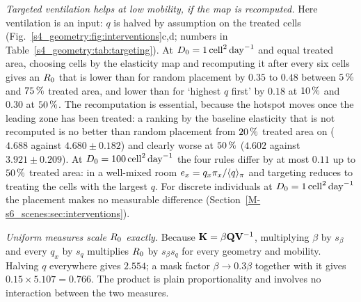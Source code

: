 \emph{Targeted ventilation helps at low mobility, if the map is recomputed.} Here ventilation is an input: $q$
is halved by assumption on the treated cells (Fig.~\ref{s4_geometry:fig:interventions}c,d; numbers in
Table~\ref{s4_geometry:tab:targeting}). At $D_0=1\,\mathrm{cell}^2\,\mathrm{day}^{-1}$ and equal treated area, choosing cells by the
elasticity map and recomputing it after every six cells gives an $R_0$ that is lower than for random
placement by $0.35$ to $0.48$ between $5\,\%$ and $75\,\%$ treated area, and lower than for `highest $q$
first' by $0.18$ at $10\,\%$ and $0.30$ at $50\,\%$.
The recomputation is essential, because the hotspot moves once the leading zone has been treated: a ranking
by the baseline elasticity that is not recomputed is no better than random placement from $20\,\%$ treated
area on ($4.688$ against $4.680\pm0.182$) and clearly worse at $50\,\%$ ($4.602$ against $3.921\pm0.209$).
At $D_0=100\,\mathrm{cell}^2\,\mathrm{day}^{-1}$ the four rules differ by at most $0.11$ up to $50\,\%$ treated area: in a well-mixed room
$e_x=q_x\pi_x/\langle q\rangle_{\pi}$ and targeting reduces to treating the cells with the largest $q$. For discrete
individuals at $D_0=1\,\mathrm{cell}^2\,\mathrm{day}^{-1}$ the placement makes no measurable difference
(Section~\ref{M-s6_scenes:sec:interventions}).

\emph{Uniform measures scale $R_0$ exactly.} Because $\mathbf{K}=\beta\mathbf{Q}\mathbf{V}^{-1}$, multiplying $\beta$ by
$s_\beta$ and every $q_x$ by $s_q$ multiplies $R_0$ by $s_\beta s_q$ for every geometry and mobility. Halving $q$ everywhere gives
$2.554$; a mask factor $\beta\to0.3\beta$ together with it gives $0.15\times5.107=0.766$. The product is
plain proportionality and involves no interaction between the two measures.
